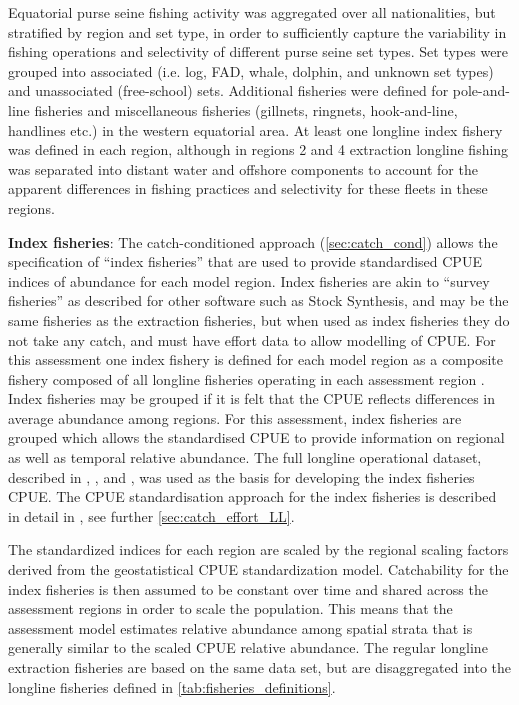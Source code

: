 Equatorial purse seine fishing activity was aggregated over all nationalities, but stratified by region and set type, in order to sufficiently capture the variability in fishing operations and selectivity of different purse seine set types. Set types were grouped into associated (i.e. log, FAD, whale, dolphin, and unknown set types) and unassociated (free-school) sets. Additional fisheries were defined for pole-and-line fisheries and miscellaneous fisheries (gillnets, ringnets, hook-and-line, handlines etc.) in the western equatorial area. At least one longline index fishery was defined in each region, although in regions 2 and 4 extraction longline fishing was separated into distant water and offshore components to account for the apparent differences in fishing practices and selectivity for these fleets in these regions.

\textbf{Index fisheries}: The catch-conditioned approach (\autoref{sec:catch_cond}) allows the specification  of ``index fisheries'' that are used to provide standardised CPUE indices of abundance for each model region. Index fisheries are akin to ``survey fisheries'' as described for other software such as Stock Synthesis, and may be the same fisheries as the extraction fisheries, but when used as index fisheries they do not take any catch, and must have effort data to allow modelling of CPUE. For this assessment one index fishery is defined for each model region as a composite fishery composed of all longline fisheries operating in each assessment region \citep{teears_cpue_2023}. Index fisheries may be grouped if it is felt that the CPUE reflects differences in average abundance among regions. For this assessment, index fisheries are grouped which allows the standardised CPUE to provide information on regional as well as temporal relative abundance. The full longline operational dataset, described in \cite{mckechnie_analysis_2015}, \cite{ducharme-barth_analysis_2020}, and \cite{teears_cpue_2023}, was used as the basis for developing the index fisheries CPUE. The CPUE standardisation approach for the index fisheries is described in detail in \cite{teears_cpue_2023}, see further \autoref{sec:catch_effort_LL}.

The standardized indices for each region are scaled by the regional scaling factors derived from the geostatistical CPUE standardization model. Catchability for the index fisheries is then assumed to be constant over time and shared across the assessment regions in order to scale the population. This means that the assessment model estimates relative abundance among spatial strata that is generally similar to the scaled CPUE relative abundance. The regular longline extraction fisheries are based on the same data set, but are disaggregated into the longline fisheries defined in \autoref{tab:fisheries_definitions}.


